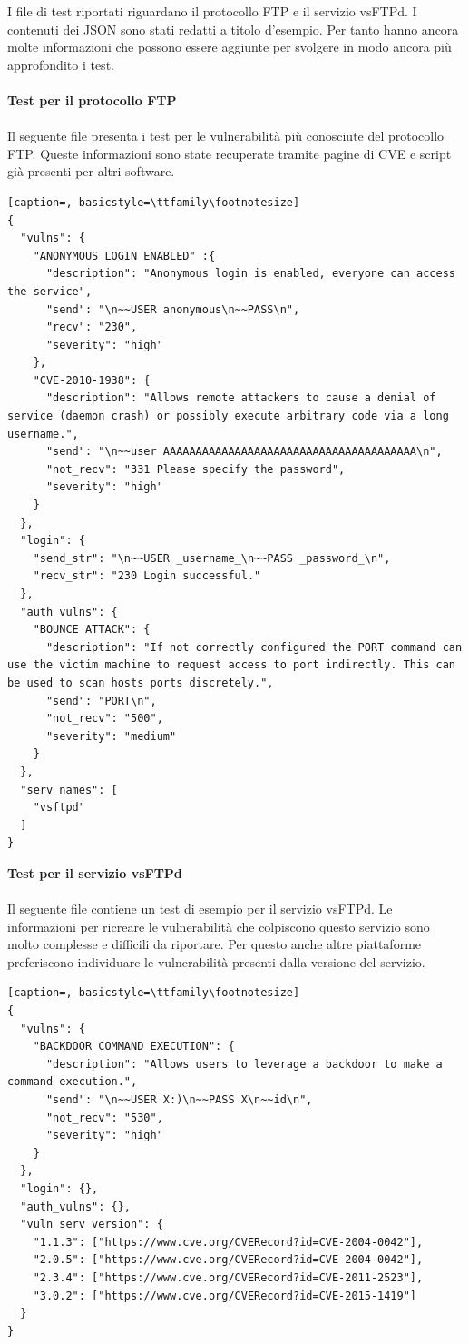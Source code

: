 \documentclass[12pt]{report}
\begin{document}
I file di test riportati riguardano il protocollo FTP e il servizio vsFTPd. I contenuti dei JSON sono stati redatti a titolo d'esempio. Per tanto hanno ancora molte informazioni che possono essere aggiunte per svolgere in modo ancora più approfondito i test.
\\\\
\noindent
\textbf{Test per il protocollo FTP}
\\\\
Il seguente file presenta i test per le vulnerabilità più conosciute del protocollo FTP. Queste informazioni sono state recuperate tramite pagine di CVE e script già presenti per altri software.
\begin{lstlisting}[caption=, basicstyle=\ttfamily\footnotesize]
{
  "vulns": {
    "ANONYMOUS LOGIN ENABLED" :{
      "description": "Anonymous login is enabled, everyone can access the service",
      "send": "\n~~USER anonymous\n~~PASS\n",
      "recv": "230",
      "severity": "high"
    },
    "CVE-2010-1938": {
      "description": "Allows remote attackers to cause a denial of service (daemon crash) or possibly execute arbitrary code via a long username.",
      "send": "\n~~user AAAAAAAAAAAAAAAAAAAAAAAAAAAAAAAAAAAAAAA\n",
      "not_recv": "331 Please specify the password",
      "severity": "high"
    }
  },
  "login": {
    "send_str": "\n~~USER _username_\n~~PASS _password_\n",
    "recv_str": "230 Login successful."
  },
  "auth_vulns": {
    "BOUNCE ATTACK": {
      "description": "If not correctly configured the PORT command can use the victim machine to request access to port indirectly. This can be used to scan hosts ports discretely.",
      "send": "PORT\n",
      "not_recv": "500",
      "severity": "medium"
    }
  },
  "serv_names": [
    "vsftpd"
  ]
}
\end{lstlisting}

\noindent
\textbf{Test per il servizio vsFTPd}
\\\\
Il seguente file contiene un test di esempio per il servizio vsFTPd. Le informazioni per ricreare le vulnerabilità che colpiscono questo servizio sono molto complesse e difficili da riportare. Per questo anche altre piattaforme preferiscono individuare le vulnerabilità presenti dalla versione del servizio. 
\begin{lstlisting}[caption=, basicstyle=\ttfamily\footnotesize]
{
  "vulns": {
    "BACKDOOR COMMAND EXECUTION": {
      "description": "Allows users to leverage a backdoor to make a command execution.",
      "send": "\n~~USER X:)\n~~PASS X\n~~id\n",
      "not_recv": "530",
      "severity": "high"
    }
  },
  "login": {},
  "auth_vulns": {},
  "vuln_serv_version": {
    "1.1.3": ["https://www.cve.org/CVERecord?id=CVE-2004-0042"],
    "2.0.5": ["https://www.cve.org/CVERecord?id=CVE-2004-0042"],
    "2.3.4": ["https://www.cve.org/CVERecord?id=CVE-2011-2523"],
    "3.0.2": ["https://www.cve.org/CVERecord?id=CVE-2015-1419"]
  }
}
\end{lstlisting}
\end{document}
